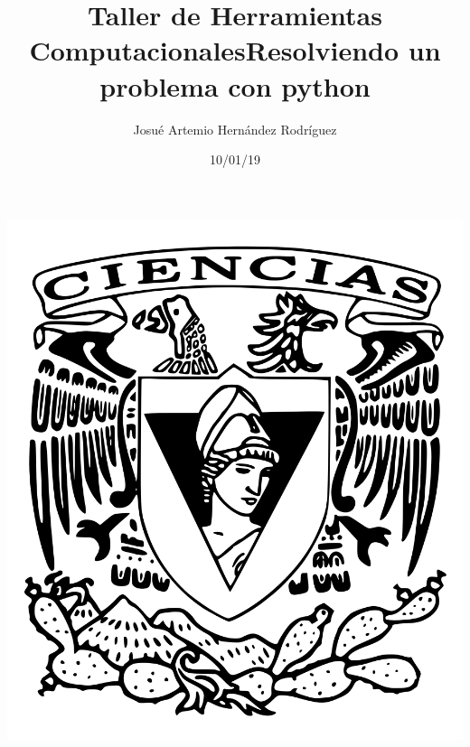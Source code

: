 \documentclass[letterpaper, 12pt, oneside]{article}%
\title{\Huge Taller de Herramientas Computacionales}
\author{Josué Artemio Hernández Rodríguez}%
\date{10/01/19}%
\begin{document}
\maketitle
\begin{center}%
\includegraphics[scale=0.2]{2.png}%
\end{center}%
\newpage%

\title{\Huge Resolviendo un problema con python\\}%
\end{document}
